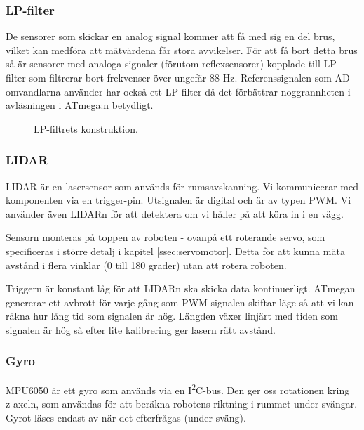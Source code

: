 \documentclass[a4paper,11pt]{article}
\begin{document}
\subsubsection{LP-filter}
De sensorer som skickar en analog signal kommer att få med sig en del brus, vilket kan medföra att mätvärdena får stora avvikelser. För att få bort detta brus så är sensorer med analoga signaler (förutom reflexsensorer) kopplade till LP-filter som filtrerar bort frekvenser över ungefär 88 Hz. Referenssignalen som AD-omvandlarna använder har också ett LP-filter då det förbättrar noggrannheten i avläsningen i ATmega:n betydligt.

\begin{figure}[h!]
	\caption{LP-filtrets konstruktion.}
	\label{fig:lpFilter}
\end{figure}

\subsubsection{LIDAR} \label{sssec:lidar}
LIDAR är en lasersensor som används för rumsavskanning. Vi kommunicerar med komponenten via en trigger-pin. Utsignalen är digital och är av typen PWM. Vi använder även LIDARn för att detektera om vi håller på att köra in i en vägg.

Sensorn monteras på toppen av roboten - ovanpå ett roterande servo, som specificeras i större detalj i kapitel \ref{ssec:servomotor}. Detta för att kunna mäta avstånd i flera vinklar (0 till 180 grader) utan att rotera roboten.

Triggern är konstant låg för att LIDARn ska skicka data kontinuerligt. ATmegan genererar ett avbrott för varje gång som PWM signalen skiftar läge så att vi kan räkna hur lång tid som signalen är hög. Längden växer linjärt med tiden som signalen är hög så efter lite kalibrering ger lasern rätt avstånd.

\subsubsection{Gyro} \label{sssec:imu}
MPU6050 är ett gyro som används via en I\textsuperscript{2}C-bus. Den ger oss rotationen kring z-axeln, som användas för att beräkna robotens riktning i rummet under svängar. Gyrot läses endast av när det efterfrågas (under sväng).
\end{document}
